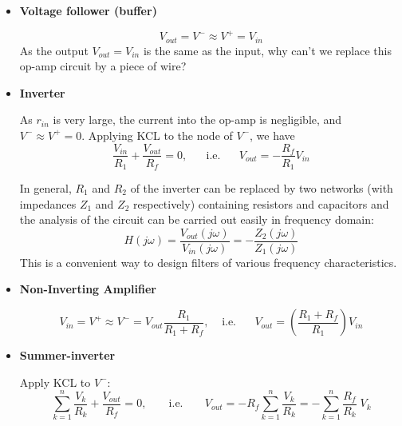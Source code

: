 \documentclass{article}
\begin{document}
\begin{itemize}
\item {\bf Voltage follower (buffer)}


\begin{equation}
  V_{out}=V^-\approx V^+=V_{in} 
\end{equation}
As the output $V_{out}=V_{in}$ is the same as the input, why can't we replace this
op-amp circuit by a piece of wire?

\item {\bf Inverter}


As $r_{in}$ is very large, the current into the op-amp is negligible, and
$V^-\approx V^+=0$. Applying KCL to the node of $V^-$, we have
\begin{equation} 
  \frac{V_{in}}{R_1}+\frac{V_{out}}{R_f}=0,\;\;\;\;\;\;\mbox{i.e.}\;\;\;\;\;\;
  V_{out}=-\frac{R_f}{R_1}V_{in}	
\end{equation}

In general, $R_1$ and $R_2$ of the inverter can be replaced by two networks (with
impedances $Z_1$ and $Z_2$ respectively) containing resistors and capacitors and
the analysis of the circuit can be carried out easily in frequency domain:
\begin{equation}
  H(j\omega)=\frac{V_{out}(j\omega)}{V_{in}(j\omega)}=-\frac{Z_2(j\omega)}{Z_1(j\omega)}
\end{equation}
This is a convenient way to design filters of various frequency characteristics.



\item {\bf Non-Inverting Amplifier}


  \begin{equation}
    V_{in}=V^+\approx V^-=V_{out}\frac{R_1}{R_1+R_f},\;\;\;\;\mbox{i.e.}
    \;\;\;\;\;\;
    V_{out}=\left(\frac{R_1+R_f}{R_1}\right)V_{in}
  \end{equation}

\item {\bf Summer-inverter}


  Apply KCL to $V^-$:
  \begin{equation} 
    \sum_{k=1}^n \frac{V_k}{R_k}+\frac{V_{out}}{R_f}=0,\;\;\;\;\;\;\;
    \mbox{i.e.}\;\;\;\;\;\;\;V_{out}=-R_f \sum_{k=1}^n \frac{V_k}{R_k}
    =- \sum_{k=1}^n \frac{R_f}{R_k} \;V_k  
  \end{equation}


\end{itemize}
\end{document}
